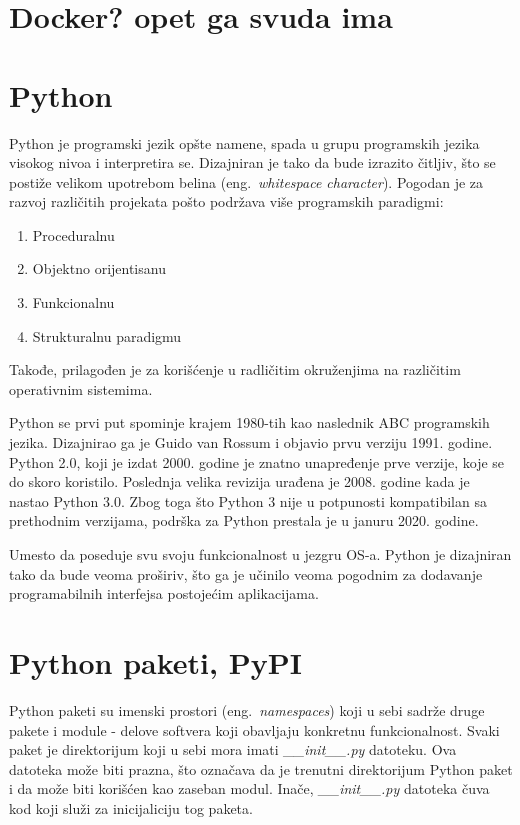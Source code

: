 \documentclass[12pt]{report}
\begin{document}
\section{Docker? opet ga svuda ima}
\section{Python}

Python \cite{python} je programski jezik opšte namene, spada u grupu programskih jezika visokog nivoa i interpretira se. Dizajniran je tako da bude izrazito čitljiv, što se postiže velikom upotrebom belina (eng.\ \textit{whitespace character}). Pogodan je za razvoj različitih projekata pošto podržava više programskih paradigmi:

\begin{enumerate}
    \item Proceduralnu
    \item Objektno orijentisanu
    \item Funkcionalnu
    \item Strukturalnu paradigmu
\end{enumerate}

Takođe, prilagođen je za korišćenje u radličitim okruženjima na različitim operativnim sistemima.

Python se prvi put spominje krajem 1980-tih kao naslednik ABC programskih jezika. Dizajnirao ga je Guido van Rossum i objavio prvu verziju 1991. godine. Python 2.0, koji je izdat 2000. godine je znatno unapređenje prve verzije, koje se do skoro koristilo.  Poslednja velika revizija urađena je 2008. godine kada je nastao Python 3.0. Zbog toga što Python 3 nije u potpunosti kompatibilan sa prethodnim verzijama, podrška za Python prestala je u januru 2020. godine.

Umesto da poseduje svu svoju funkcionalnost u jezgru OS-a. Python je dizajniran tako da  bude veoma proširiv, što ga je učinilo veoma pogodnim za dodavanje programabilnih interfejsa postojećim aplikacijama.

\section{Python paketi, PyPI}

Python paketi su imenski prostori (eng.\ \textit{namespaces}) koji u sebi sadrže druge pakete i module - delove softvera koji obavljaju konkretnu funkcionalnost. Svaki paket je direktorijum koji u sebi mora imati \textit{\_\_init\_\_.py} datoteku. Ova datoteka može biti prazna, što označava da je trenutni direktorijum Python paket i da može biti korišćen kao zaseban modul. Inače, \textit{\_\_init\_\_.py} datoteka čuva kod koji služi za inicijaliciju tog paketa.
\end{document}
